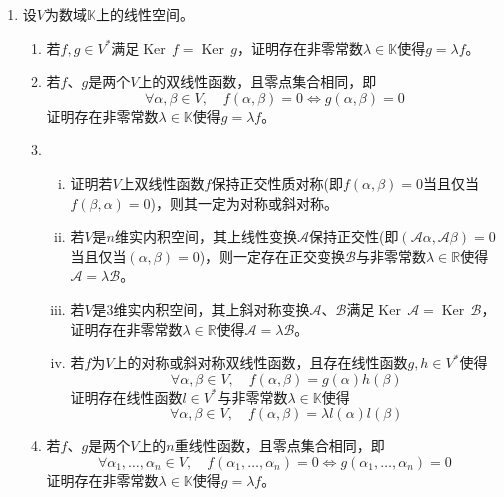 \documentclass[a4paper,UTF8,fontset=windows,AutoFakeBold]{ctexart}
\DeclareMathOperator{\Ker}{Ker\,}
\newcommand*{\ma}{\mathcal{A}}
\newcommand*{\mb}{\mathcal{B}}
\begin{document}
\begin{enumerate}
    \item
    设$V$为数域$\mathbb{K}$上的线性空间。
    \begin{enumerate}
        \item 若$f,g\in V^*$满足$\Ker f=\Ker g$，证明存在非零常数$\lambda\in\mathbb{K}$使得$g=\lambda f$。
        \item 若$f$、$g$是两个$V$上的双线性函数，且零点集合相同，即
        $$\forall\alpha,\beta\in V,\quad f(\alpha,\beta)=0\Leftrightarrow g(\alpha,\beta)=0$$
        证明存在非零常数$\lambda\in\mathbb{K}$使得$g=\lambda f$。
        \item
        \begin{enumerate}[(i)]
            \item 证明若$V$上双线性函数$f$保持正交性质对称(即$f(\alpha,\beta)=0$当且仅当$f(\beta,\alpha)=0$)，则其一定为对称或斜对称。
            \item 若$V$是$n$维实内积空间，其上线性变换$\ma$保持正交性(即$(\ma\alpha,\ma\beta)=0$当且仅当$(\alpha,\beta)=0$)，则一定存在正交变换$\mb$与非零常数$\lambda\in\mathbb{R}$使得$\ma=\lambda\mb$。
            \item 若$V$是3维实内积空间，其上斜对称变换$\ma$、$\mb$满足$\Ker\ma=\Ker\mb$，证明存在非零常数$\lambda\in\mathbb{R}$使得$\ma=\lambda\mb$。
            \item 若$f$为$V$上的对称或斜对称双线性函数，且存在线性函数$g,h\in V^*$使得
            $$\forall\alpha,\beta\in V,\quad f(\alpha,\beta)=g(\alpha)h(\beta)$$
            证明存在线性函数$l\in V^*$与非零常数$\lambda\in\mathbb{K}$使得
            $$\forall\alpha,\beta\in V,\quad f(\alpha,\beta)=\lambda l(\alpha)l(\beta)$$
        \end{enumerate}
        \item 若$f$、$g$是两个$V$上的$n$重线性函数，且零点集合相同，即
        $$\forall\alpha_1,\dots,\alpha_n\in V,\quad f(\alpha_1,\dots,\alpha_n)=0\Leftrightarrow g(\alpha_1,\dots,\alpha_n)=0$$
        证明存在非零常数$\lambda\in\mathbb{K}$使得$g=\lambda f$。
    \end{enumerate}


\end{enumerate}
\end{document}
